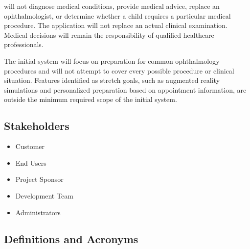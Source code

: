 \documentclass[12pt]{article}
\begin{document}
\progname{} will not diagnose medical conditions, provide medical advice, replace an ophthalmologist,
or determine whether a child requires a particular medical procedure. The application will not
replace an actual clinical examination. Medical decisions will remain the responsibility of qualified
healthcare professionals.

The initial system will focus on preparation for common ophthalmology procedures and will not
attempt to cover every possible procedure or clinical situation. Features identified as stretch
goals, such as augmented reality simulations and personalized preparation based on appointment
information, are outside the minimum required scope of the initial system.

\subsection{Stakeholders}
\begin{itemize}
\item Customer
\item End Users
\item Project Sponsor
\item Development Team
\item Administrators
\end{itemize}

\subsection{Definitions and Acronyms} \label{sec_DefinitionsAndAcronyms}

\renewcommand{\arraystretch}{1.3}
\end{document}
